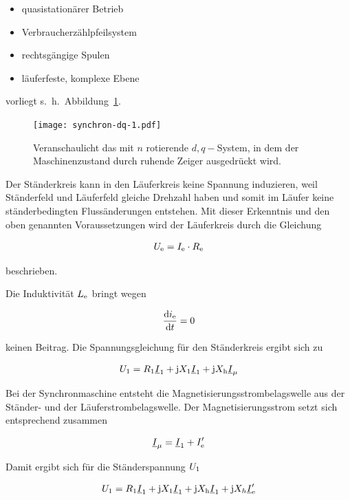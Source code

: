 \begin{itemize}
	\item quasistationärer Betrieb
	\item Verbraucherzählpfeilsystem
	\item rechtsgängige Spulen
	\item läuferfeste, komplexe Ebene
\end{itemize}

vorliegt s.~h.~Abbildung~\ref{fig:dq-synchron-1}.

\begin{figure}[!h]
\centering
\texttt{[image: synchron-dq-1.pdf]}
\label{fig:dq-synchron-1}
\caption{Veranschaulicht das mit $n$ rotierende $d, q-$System, in dem der Maschinenzustand durch ruhende Zeiger ausgedrückt wird.}
\end{figure}

Der Ständerkreis kann in den Läuferkreis keine Spannung induzieren, weil Ständerfeld und Läuferfeld gleiche Drehzahl haben und somit im Läufer keine ständerbedingten Flussänderungen entstehen.
Mit dieser Erkenntnis und den oben genannten Voraussetzungen wird der Läuferkreis durch die Gleichung

\begin{align}
U_{\mathrm{e}} = I_{\mathrm{e}} \cdot R_{\mathrm{e}}
\end{align}

beschrieben.

Die Induktivität $L_{\mathrm{e}}$ bringt wegen

\begin{align*}
\frac{\mathrm{d}i_{\mathrm{e}}}{\mathrm{d}t} = 0
\end{align*}

keinen Beitrag.
Die Spannungsgleichung für den Ständerkreis ergibt sich zu

\begin{align}
U_{\mathrm{1}} = R_{\mathrm{1}}\underline{I}_{\mathrm{1}}+\mathrm{j}X_{\mathrm{1}}\underline{I}_{\mathrm{1}}+\mathrm{j}X_{\mathrm{h}}\underline{I}_\mu
\end{align}

Bei der Synchronmaschine entsteht die Magnetisierungsstrombelagswelle aus der Ständer- und der Läuferstrombelagswelle.
Der Magnetisierungsstrom setzt sich entsprechend zusammen

\begin{align}
\underline{I}_\mu = \underline{I}_{\mathrm{1}} + I'_{\mathrm{e}}
\end{align}

Damit ergibt sich für die Ständerspannung $U_{\mathrm{1}}$

\begin{align}
U_{\mathrm{1}} = R_{\mathrm{1}}\underline{I}_{\mathrm{1}} + \mathrm{j}X_{\mathrm{1}}\underline{I}_{\mathrm{1}} + \mathrm{j}X_{\mathrm{h}}\underline{I}_{\mathrm{1}} + \mathrm{j}X_{h}\underline{I}'_{\mathrm{e}}
\end{align}

